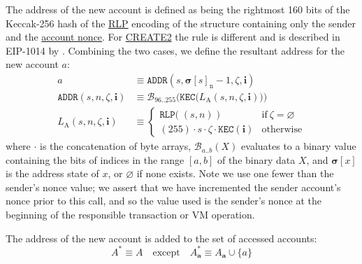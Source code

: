 \documentclass[9pt,oneside]{amsart}
\begin{document}
\begin{multicols}{2}
The address of the new account is defined as being the rightmost 160 bits of the Keccak-256 hash of the \hyperlink{rlp}{RLP} encoding of the structure containing only the sender and the \hyperlink{account_nonce}{account nonce}.
For {\small \hyperlink{create2}{CREATE2}} the rule is different and is described in EIP-1014 by \cite{EIP-1014}.
Combining the two cases, we define the resultant address for the new account $a$:
\begin{align}
a & \equiv \mathtt{ADDR}(s, \boldsymbol{\sigma}[s]_{\mathrm{n}} - 1, \zeta, \mathbf{i}) \\
\label{eq:new-address} \mathtt{ADDR}(s, n, \zeta, \mathbf{i}) & \equiv \mathcal{B}_{96..255}\Big(\mathtt{KEC}\big( L_{\mathrm{A}}(s, n, \zeta, \mathbf{i})\big) \Big) \\
L_{\mathrm{A}}(s, n, \zeta, \mathbf{i}) & \equiv \begin{cases}
\mathtt{RLP}\big(\;(s, n)\;\big) & \text{if}\ \zeta = \varnothing \\
(255) \cdot s \cdot \zeta \cdot \mathtt{KEC}(\mathbf{i}) & \text{otherwise}
\end{cases}
\end{align}
where $\cdot$ is the concatenation of byte arrays, $\mathcal{B}_{a..b}(X)$ evaluates to a binary value containing the bits of indices in the range $[a, b]$ of the binary data $X$, and $\boldsymbol{\sigma}[x]$ is the address state of $x$, or $\varnothing$ if none exists. Note we use one fewer than the sender's nonce value; we assert that we have incremented the sender account's nonce prior to this call, and so the value used is the sender's nonce at the beginning of the responsible transaction or VM operation.

The address of the new account is added to the set of accessed accounts:
\begin{equation}
A^* \equiv A \quad \text{except} \quad A^*_{\mathbf{a}} \equiv A_{\mathbf{a}} \cup \{a\}
\end{equation}


\end{multicols}
\end{document}

